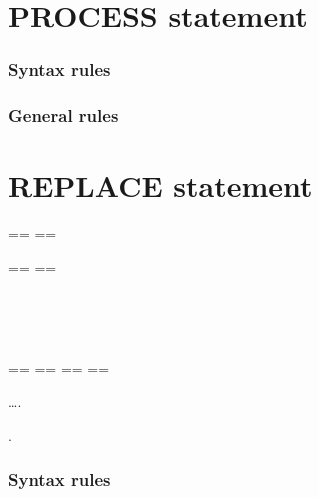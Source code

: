\section{PROCESS statement}

\begin{syntax}[\miscextcolour]
\end{syntax}

\subsubsection{Syntax rules}

\subsubsection{General rules}

\section{REPLACE statement}

\begin{syntax}
  \begin{0-1}
  \end{0-1}
  \begin{1=}
    \begin{1=}
      == \pseudotext == \\
      \identifier
    \end{1=}
    \begin{1=}
      == \pseudotext == \\
      \identifier
    \end{1=} \\

    \begin{1=}
       \\
    \end{1=}
    ==  ==
    ==  ==
  \end{1=}\ldots .
\end{syntax}

\begin{syntax}
  \begin{0-1}
  \end{0-1}
  .
\end{syntax}

\subsubsection{Syntax rules}

